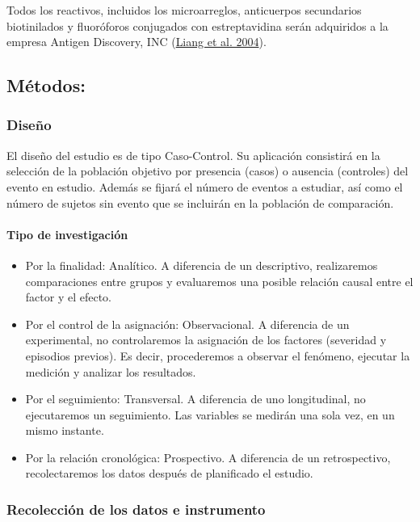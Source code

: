 \documentclass[
  a4paper]{article}
\begin{document}
Todos los reactivos, incluidos los microarreglos, anticuerpos
secundarios biotinilados y fluoróforos conjugados con estreptavidina
serán adquiridos a la empresa Antigen Discovery, INC
(\protect\hyperlink{ref-adiinc}{Liang et al. 2004}).

\hypertarget{muxe9todos}{%
\subsection{Métodos:}\label{muxe9todos}}

\hypertarget{diseuxf1o}{%
\subsubsection{Diseño}\label{diseuxf1o}}

El diseño del estudio es de tipo Caso-Control. Su aplicación consistirá
en la selección de la población objetivo por presencia (casos) o
ausencia (controles) del evento en estudio. Además se fijará el número
de eventos a estudiar, así como el número de sujetos sin evento que se
incluirán en la población de comparación.

\hypertarget{tipo-de-investigaciuxf3n}{%
\paragraph{Tipo de investigación}\label{tipo-de-investigaciuxf3n}}

\begin{itemize}
\item
  Por la finalidad: Analítico. A diferencia de un descriptivo,
  realizaremos comparaciones entre grupos y evaluaremos una posible
  relación causal entre el factor y el efecto.
\item
  Por el control de la asignación: Observacional. A diferencia de un
  experimental, no controlaremos la asignación de los factores
  (severidad y episodios previos). Es decir, procederemos a observar el
  fenómeno, ejecutar la medición y analizar los resultados.
\item
  Por el seguimiento: Transversal. A diferencia de uno longitudinal, no
  ejecutaremos un seguimiento. Las variables se medirán una sola vez, en
  un mismo instante.
\item
  Por la relación cronológica: Prospectivo. A diferencia de un
  retrospectivo, recolectaremos los datos después de planificado el
  estudio.
\end{itemize}

\hypertarget{recolecciuxf3n-de-los-datos-e-instrumento}{%
\subsubsection{Recolección de los datos e
instrumento}\label{recolecciuxf3n-de-los-datos-e-instrumento}}
\end{document}
